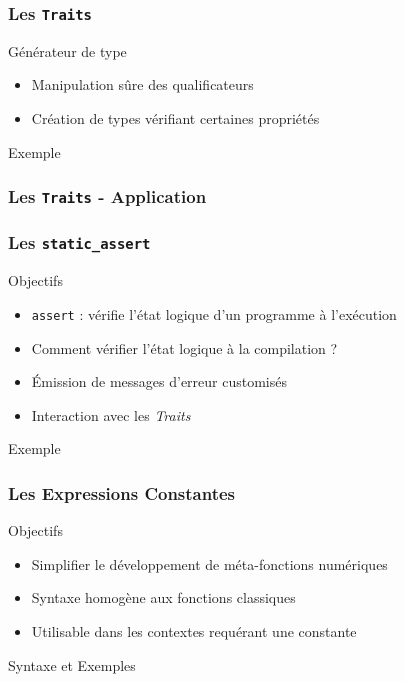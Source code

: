 \documentclass[svgnames]{beamer}
\begin{document}
\frame
{
  \frametitle{Les \texttt{Traits}}

  \begin{block}{Générateur de type}
  \begin{itemize}
  \item Manipulation sûre des qualificateurs
  \item Création de types vérifiant certaines propriétés
  \end{itemize}
  \end{block}

  \begin{block}{Exemple}
  \medskip
  \end{block}
}

\frame
{
  \frametitle{Les \texttt{Traits} - Application}
}

\frame
{
  \frametitle{Les \texttt{static\_assert}}

  \begin{block}{Objectifs}
  \begin{itemize}
  \item \texttt{assert} : vérifie l'état logique d'un programme à l'exécution
  \item Comment vérifier l'état logique à la compilation ?
  \item Émission de messages d'erreur customisés
  \item Interaction avec les \textit{Traits}
  \end{itemize}
  \end{block}

  \begin{block}{Exemple}
  \medskip
  \end{block}
}

\frame
{
  \frametitle{Les Expressions Constantes}

  \begin{block}{Objectifs}
  \begin{itemize}
  \item Simplifier le développement de méta-fonctions numériques
  \item Syntaxe homogène aux fonctions classiques
  \item Utilisable dans les contextes requérant une constante
  \end{itemize}
  \end{block}

  \begin{block}{Syntaxe et Exemples}
  \begin{overlayarea}{\textwidth}{5cm}
  \end{overlayarea}
  \end{block}
}
\end{document}

